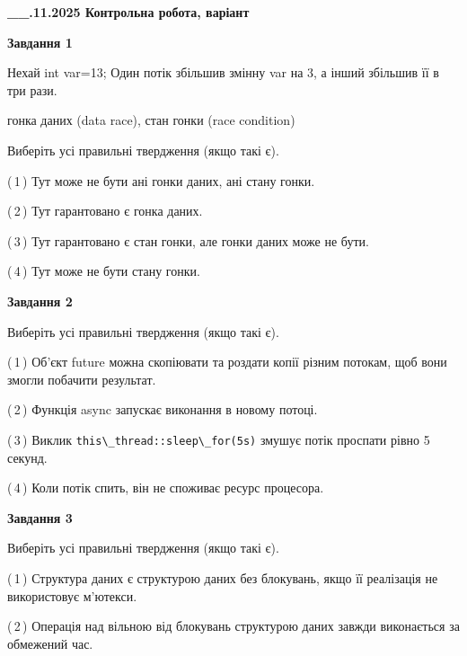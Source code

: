 \documentclass[12pt, ukrainian]{article}
\def\code#1{\Verb!#1!}
\begin{document}
\begin {large}

\textbf{\_\_.11.2025 Контрольна робота, варіант  }\par


{

\begin{center}
\textbf{Завдання 1}
\end{center}
Нехай int var=13; Один потік збільшив змінну var на 3, а інший збільшив її в три рази.

гонка даних (data race), стан гонки (race condition)

Виберіть усі правильні твердження (якщо такі є).\par
\vspace{2mm}
(\,1\,) Тут може не бути ані гонки даних, ані стану гонки.%

(\,2\,) Тут гарантовано є гонка даних.%

(\,3\,) Тут гарантовано є стан гонки, але гонки даних може не бути.%

(\,4\,) Тут може не бути стану гонки.%



\begin{center}
\textbf{Завдання 2}
\end{center}
Виберіть усі правильні твердження (якщо такі є).\par
\vspace{2mm}

(\,1\,) Об’єкт future можна скопіювати та роздати копії різним потокам, щоб вони змогли побачити результат.%

(\,2\,) Функція async запускає виконання в новому потоці.%

(\,3\,) Виклик \code{this\_thread::sleep\_for(5s)} змушує потік проспати рівно 5 секунд.%

(\,4\,) Коли потік спить, він не споживає ресурс процесора.%



\begin{center}
\textbf{Завдання 3}
\end{center}
Виберіть усі правильні твердження (якщо такі є).\par
\vspace{2mm}

(\,1\,) Структура даних є структурою даних без блокувань, якщо її реалізація не використовує м’ютекси.%

(\,2\,) Операція над вільною від блокувань структурою даних завжди виконається за обмежений час.%

}
\end{large}
\end{document}
